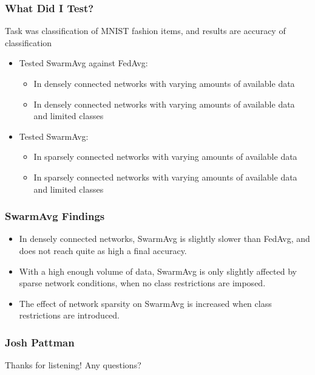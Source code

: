 \documentclass{beamer}
\begin{document}
	\begin{frame}
		\frametitle{What Did I Test?}
		Task was classification of MNIST fashion items, and results are accuracy of classification
		\begin{itemize}
			\item Tested SwarmAvg against FedAvg:
			\begin{itemize}
				\item In densely connected networks with varying amounts of available data
				\item In densely connected networks with varying amounts of available data and limited classes
			\end{itemize}
			\item Tested SwarmAvg:
			\begin{itemize}
				\item In sparsely connected networks with varying amounts of available data
				\item In sparsely connected networks with varying amounts of available data and limited classes
			\end{itemize}
		\end{itemize}
	\end{frame}

	\begin{frame}
		\frametitle{SwarmAvg Findings}
		\begin{itemize}
			\item In densely connected networks, SwarmAvg is slightly slower than FedAvg, and does not reach quite as high a final accuracy.
			\item With a high enough volume of data, SwarmAvg is only slightly affected by sparse network conditions, when no class restrictions are imposed.
			\item The effect of network sparsity on SwarmAvg is increased when class restrictions are introduced.
		\end{itemize}
	\end{frame}

	\begin{frame}
		\frametitle{Josh Pattman}
		Thanks for listening! Any questions?
	\end{frame}
	
\end{document}
